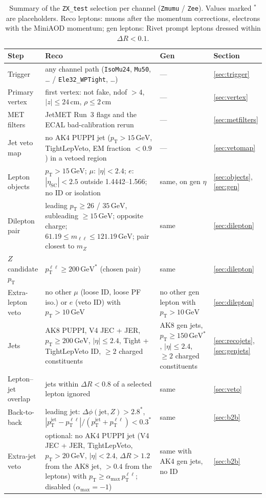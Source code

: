 \documentclass[11pt]{article}
\newcommand{\pt}{p_{\mathrm{T}}}
\newcommand{\GeV}{\ensuremath{\,\mathrm{GeV}}}
\newcommand{\ptll}{\pt^{\ell\ell}}
\newcommand{\ptj}{\pt^{\mathrm{jet}}}
\newcommand{\code}[1]{\texttt{#1}}
\begin{document}
\begin{table}[htbp]
\centering
\caption{Summary of the \code{ZX\_test} selection per channel (\code{Zmumu} / \code{Zee}). Values marked $^*$ are
placeholders. Reco leptons: muons after the momentum corrections, electrons with the MiniAOD momentum; gen leptons:
Rivet prompt leptons dressed within $\Delta R < 0.1$.}
\label{tab:selsummary}
\small
\begin{tabularx}{\textwidth}{>{\raggedright\arraybackslash}p{2.9cm}>{\raggedright\arraybackslash}X>{\raggedright\arraybackslash}p{3.6cm}l}
\toprule
Step & Reco & Gen & Section \\
\midrule
Trigger & any channel path (\code{IsoMu24}, \code{Mu50}, \dots{} / \code{Ele32\_WPTight}, \dots) & --- & \ref{sec:trigger} \\
Primary vertex & first vertex: not fake, ndof $> 4$, $|z| \leq 24$\,cm, $\rho \leq 2$\,cm & --- & \ref{sec:vertex} \\
MET filters & 8 JetMET Run~3 flags and the ECAL bad-calibration rerun & --- & \ref{sec:metfilters} \\
Jet veto map & no AK4 PUPPI jet ($\pt > 15\GeV$, TightLepVeto, EM fraction $< 0.9$) in a vetoed region & --- & \ref{sec:vetomap} \\
Lepton objects & $\pt > 15\GeV$; $\mu$: $|\eta| < 2.4$; $e$: $|\eta_\mathrm{SC}| < 2.5$ outside 1.4442--1.566; no ID or isolation & same, on gen $\eta$ & \ref{sec:objects}, \ref{sec:gen} \\
Dilepton pair & leading $\pt \geq 26$ / $35\GeV$, subleading $\geq 15\GeV$; opposite charge; $61.19 \leq m_{\ell\ell} \leq 121.19\GeV$; pair closest to $m_Z$ & same & \ref{sec:dilepton} \\
$Z$ candidate $\pt$ & $\ptll \geq 200\GeV^*$ (chosen pair) & same & \ref{sec:dilepton} \\
Extra-lepton veto & no other $\mu$ (loose ID, loose PF iso.) or $e$ (veto ID) with $\pt > 10\GeV$ & no other gen lepton with $\pt > 10\GeV$ & \ref{sec:dilepton} \\
Jets & AK8 PUPPI, V4 JEC + JER, $\pt \geq 200\GeV$, $|\eta| \leq 2.4$, Tight + TightLepVeto ID, $\geq 2$ charged constituents & AK8 gen jets, $\pt \geq 150\GeV^*$, $|\eta| \leq 2.4$, $\geq 2$ charged constituents & \ref{sec:recojets}, \ref{sec:genjets} \\
Lepton--jet overlap & jets within $\Delta R < 0.8$ of a selected lepton ignored & same & \ref{sec:veto} \\
Back-to-back & leading jet: $\Delta\phi(\text{jet}, Z) > 2.8^*$, $|\ptj - \ptll|/(\ptj + \ptll) < 0.3^*$ & same & \ref{sec:b2b} \\
Extra-jet veto & optional: no AK4 PUPPI jet (V4 JEC + JER, TightLepVeto, $\pt > 20\GeV$, $|\eta| < 2.4$, $\Delta R > 1.2$ from the AK8 jet, $> 0.4$ from the leptons) with $\pt \geq \alpha_\mathrm{max}\,\ptll$; disabled ($\alpha_\mathrm{max} = -1$) & same with AK4 gen jets, no ID & \ref{sec:b2b} \\
\bottomrule
\end{tabularx}
\end{table}
\end{document}

